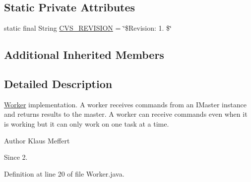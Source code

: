 \subsection*{Static Private Attributes}
\begin{DoxyCompactItemize}
\item 
static final String \hyperlink{classorg_1_1jgap_1_1distr_1_1_worker_a32010b95d3aeeab1b9135157d47f35f4}{C\-V\-S\-\_\-\-R\-E\-V\-I\-S\-I\-O\-N} = \char`\"{}\$Revision\-: 1. \$\char`\"{}
\end{DoxyCompactItemize}
\subsection*{Additional Inherited Members}


\subsection{Detailed Description}
\hyperlink{classorg_1_1jgap_1_1distr_1_1_worker}{Worker} implementation. A worker receives commands from an I\-Master instance and returns results to the master. A worker can receive commands even when it is working but it can only work on one task at a time.

\begin{DoxyAuthor}{Author}
Klaus Meffert 
\end{DoxyAuthor}
\begin{DoxySince}{Since}
2. 
\end{DoxySince}


Definition at line 20 of file Worker.\-java.



